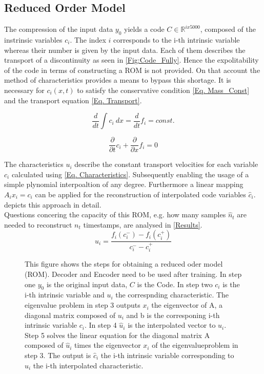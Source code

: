 \documentclass[12pt, a4paper]{article}
\begin{document}
\subsection{Reduced Order Model}\label{Reduced Order Model}
The compression of the input data $y_0$ yields a code $C \in \mathbb{R}^{ix5000}$, composed  of the instrinsic variables \(c_i\). The index \(i\) corresponds to the i-th intrinsic variable whereas their number is given by the input data. Each of them describes the transport of a discontinuity as seen in \cref{Fig:Code_Fully}. Hence the expolitability of the code in terms of constructing a ROM is not provided. On that account the method of characteristics \cite{Dret2016} provides a means to bypass this shortage. It is necessary for $c_i(x,t)$ to satisfy the conservative condition \cref{Eq. Mass_Const} and the transport equation \cref{Eq. Transport}.\\
\noindent\begin{minipage}{.5\linewidth}
	\begin{equation}
	\frac{d}{dt}\int c_i\ dx = \frac{d}{dt}f_i = const. \label{Eq. Mass_Const}
	\end{equation}
\end{minipage}%
\begin{minipage}{.5\linewidth}
	\begin{equation}
	\frac{\partial}{\partial t}c_i + \frac{\partial}{\partial x}f_i = 0 \label{Eq. Transport}
	\end{equation}
\end{minipage}
The characteristics $u_i$ describe the constant transport velocities for each variable $c_i$ calculated using \cref{Eq. Characteristics}. Subsequently enabling the usage of a simple plynomial interpoaltion of any degree. Furthermore a linear mapping \(A_ix_i=c_i\) can be applied for the reconstruction of interpolated code variables \(\hat{c}_i\).  depicts this approach in detail.\\
Questions concering the capacity of this ROM, e.g. how many samples \(\hat{n}_t\) are needed to reconstruct \(n_t\) timestamps, are analysed in \cref{Results}.
\begin{equation}
	u_i = \frac{f_i(c^-_i) - f_i(c^+_i)}{c^-_i - c^+_i}
	\label{Eq. Characteristics}
\end{equation}
\begin{figure}
	\centering
	
	\caption{This figure shows the steps for obtaining a reduced oder model (ROM). Decoder and Encoder need to be used after training. In step one $y_0$ is the original input data, $C$ is the Code. In step two $c_i$ is the i-th intrinsic variable and $u_i$ the correspnding characteristic. The eigenvalue problem in step 3 outputs $x_i$ the eigenvector of A, a diagonal matrix composed of $u_i$ and b is the corresponing i-th intrinsic variable $c_i$. In step 4 $\hat{u}_i$ is the interpolated vector to $u_i$. Step 5 solves the linear equation for the diagonal matrix A composed of $\hat{u}_i$ times the eigenvector $x_i$ of the eigenvalueproblem in step 3. The output is $\hat{c}_i$ the i-th intrinsic variable corresponding to $\hat{u}_i$ the i-th interpolated characteristic.}
	\label{Fig. Flowchart}
\end{figure}
\end{document}
